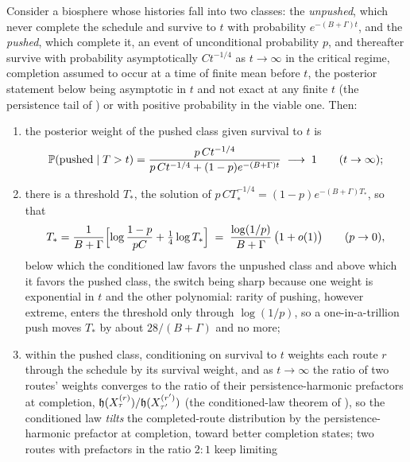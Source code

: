 \begin{remark}
\begin{proposition}\label{sch:prop:threshold}
Consider a biosphere whose histories fall into two classes: the
\emph{unpushed}, which never complete the schedule and survive to $t$
with probability $e^{-(B+\Gamma)t}$, and the \emph{pushed}, which
complete it, an event of unconditional probability $p$, and thereafter survive with probability asymptotically $C t^{-1/4}$ as $t \to \infty$ in the critical regime, completion assumed to occur at a time of finite mean before $t$, the posterior statement below being asymptotic in $t$ and not exact at any finite $t$
(the persistence tail of \cite{GoldenSurvivorship}) or with positive probability in the viable
one. Then:
\begin{enumerate}[label=\emph{(\roman*)},itemsep=2pt]
\item the posterior weight of the pushed class given survival to $t$ is
\begin{equation}\label{sch:eq:pushposterior}
\mathbb{P}(\text{pushed}\mid T>t)=\frac{p\,Ct^{-1/4}}{p\,Ct^{-1/4}+(1-p)e^{-(B+\Gamma)t}}
\;\longrightarrow\;1\qquad(t\to\infty);
\end{equation}
\item there is a threshold $T_\ast$, the solution of
$p\,CT_\ast^{-1/4}=(1-p)e^{-(B+\Gamma)T_\ast}$, so that
\begin{equation}\label{sch:eq:threshold}
T_\ast=\frac{1}{B+\Gamma}\Bigl[\log\frac{1-p}{pC}+\tfrac14\log T_\ast\Bigr]
\;=\;\frac{\log(1/p)}{B+\Gamma}\,\bigl(1+o(1)\bigr)\qquad(p\to0),
\end{equation}
below which the conditioned law favors the unpushed class and above
which it favors the pushed class, the switch being sharp because one
weight is exponential in $t$ and the other polynomial: rarity of
pushing, however extreme, enters the threshold only through
$\log(1/p)$, so a one-in-a-trillion push moves $T_\ast$ by about
$28/(B+\Gamma)$ and no more;
\item within the pushed class, conditioning on survival to $t$ weights
each route $r$ through the schedule by its survival weight, and as
$t\to\infty$ the ratio of two routes' weights converges to the ratio of
their persistence-harmonic prefactors at completion,
$\mathfrak{h}(X^{(r)}_\tau)/\mathfrak{h}(X^{(r')}_{\tau'})$ (the conditioned-law theorem of \cite{GoldenSurvivorship}), so the
conditioned law \emph{tilts} the completed-route distribution by the
persistence-harmonic prefactor at completion, toward better completion
states; two routes with prefactors in the ratio $2{:}1$ keep limiting

\end{enumerate}
\end{proposition}
\end{remark}
